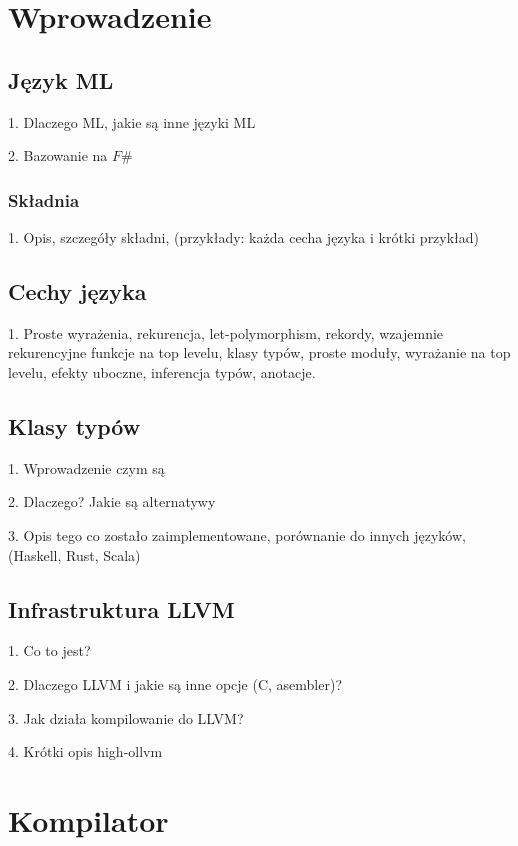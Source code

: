 \documentclass[declaration,shortabstract]{iithesis}
\author         {Mateusz Lewko}
\begin{document}

\chapter{Wprowadzenie}
\section{Język ML}

1. Dlaczego ML, jakie są inne języki ML

2. Bazowanie na $ F\# $

\subsection{Składnia}

1. Opis, szczegóły składni, (przykłady: każda cecha języka i krótki przykład)

\section{Cechy języka}

1. Proste wyrażenia, rekurencja, let-polymorphism, rekordy,
wzajemnie rekurencyjne funkcje na top levelu, klasy typów, proste moduły, 
wyrażanie na top levelu, efekty uboczne, inferencja typów, anotacje.

\section{Klasy typów}

1. Wprowadzenie czym są 

2. Dlaczego? Jakie są alternatywy

3. Opis tego co zostało zaimplementowane, porównanie do innych języków, (Haskell,
Rust, Scala)

\section{Infrastruktura LLVM}

1. Co to jest? 

2. Dlaczego LLVM i jakie są inne opcje (C, asembler)? 

3. Jak działa kompilowanie do LLVM? 

4. Krótki opis high-ollvm 

\chapter{Kompilator}
\end{document}
